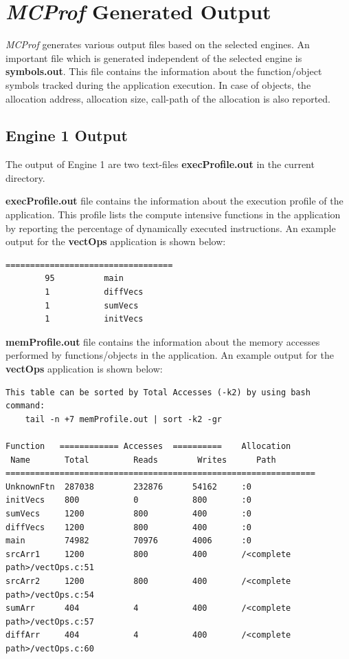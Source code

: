 \documentclass[10pt]{article}
\newcommand{\MCPROF}{\emph{MCProf}}
\begin{document}
\section{\MCPROF{} Generated Output}
\label{sec:output}

\MCPROF{} generates various output files based on the selected engines. An
important file which is generated independent of the selected engine is
\textbf{symbols.out}.  This file contains the information about the
function/object symbols tracked during the application execution. In case of
objects, the allocation address, allocation size, call-path of the allocation is
also reported.

\subsection{Engine 1 Output}

The output of Engine 1 are two text-files \textbf{execProfile.out} in the current
directory.

\textbf{execProfile.out} file contains the information about the
execution profile of the application. This profile lists the compute intensive
functions in the application by reporting the percentage of dynamically executed
instructions. An example output for the \textbf{vectOps} application is shown below:

{
\scriptsize
\begin{Verbatim}[frame=single, samepage=true]
%Exec.Instr.        Function Name
==================================
        95          main
        1           diffVecs
        1           sumVecs
        1           initVecs
\end{Verbatim}
}

\textbf{memProfile.out} file contains the information about the memory accesses
performed by functions/objects in the application. An example output for the
\textbf{vectOps} application is shown below:

{
\scriptsize
\begin{Verbatim}[frame=single, samepage=true]
This table can be sorted by Total Accesses (-k2) by using bash command:
    tail -n +7 memProfile.out | sort -k2 -gr

Function   ============ Accesses  ==========    Allocation
 Name       Total         Reads        Writes      Path
===============================================================
UnknownFtn  287038        232876      54162     :0
initVecs    800           0           800       :0
sumVecs     1200          800         400       :0
diffVecs    1200          800         400       :0
main        74982         70976       4006      :0
srcArr1     1200          800         400       /<complete path>/vectOps.c:51
srcArr2     1200          800         400       /<complete path>/vectOps.c:54
sumArr      404           4           400       /<complete path>/vectOps.c:57
diffArr     404           4           400       /<complete path>/vectOps.c:60
\end{Verbatim}
}
\end{document}
